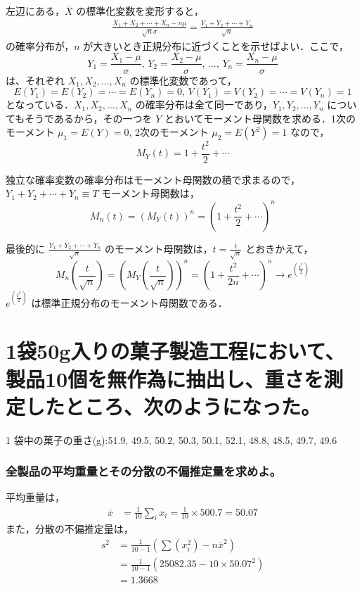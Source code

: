 \documentclass[titlepage,a4paper]{jsarticle}
\begin{document}
左辺にある，$\overline{X}$ の標準化変数を変形すると，
\begin{align}
  \frac{X_1 + X_2 + \cdots + X_n - n\mu}{\sqrt{n} \sigma} = \frac{Y_1 + Y_2 + \cdots + Y_n}{\sqrt{n}}
\end{align}
の確率分布が，$n$ が大きいとき正規分布に近づくことを示せばよい．ここで，
\[
  Y_1 = \frac{X_1 - \mu}{\sigma}, \, Y_2 = \frac{X_2 - \mu}{\sigma}, \, \ldots, \, Y_n = \frac{X_n - \mu}{\sigma}
\]
は、それぞれ $X_1, X_2, \ldots, X_n$ の標準化変数であって，
\[
  E(Y_1) = E(Y_2) = \cdots = E(Y_n) = 0, \, V(Y_1) = V(Y_2) = \cdots = V(Y_n) = 1
\]
となっている．$X_1, X_2, \ldots, X_n$ の確率分布は全て同一であり，$Y_1, Y_2, \ldots, Y_n$ についてもそうであるから，その一つを $Y$ とおいてモーメント母関数を求める．1次のモーメント $\mu_1 = E(Y) = 0$, 2次のモーメント $\mu_2 = E(Y^2) = 1$ なので，
\[
  M_Y(t) = 1 + \frac{t^2}{2} + \cdots
\]

独立な確率変数の確率分布はモーメント母関数の積で求まるので，$Y_1 + Y_2 + \cdots + Y_n \equiv T$ モーメント母関数は，
\[
  M_n(t) = \left( M_Y(t) \right)^n = \left( 1 + \frac{t^2}{2} + \cdots \right)^n
\]

最後的に $\frac{Y_1 + Y_2 + \cdots + Y_n}{\sqrt{n}}$ のモーメント母関数は，$t = \frac{t}{\sqrt{n}}$ とおきかえて，
\[
  M_n \left( \frac{t}{\sqrt{n}} \right) = \left( M_Y \left( \frac{t}{\sqrt{n}} \right) \right)^n
  = \left( 1 + \frac{t^2}{2n} + \cdots \right)^n \to e^{\left( \frac{t^2}{2} \right)}
\]
$e^{\left( \frac{t^2}{2} \right)}$ は標準正規分布のモーメント母関数である．
\section{1袋50g入りの菓子製造工程において、製品10個を無作為に抽出し、重さを測定したところ、次のようになった。}%
1 袋中の菓子の重さ(g):51.9, 49.5, 50.2, 50.3, 50.1, 52.1, 48.8, 48.5, 49.7, 49.6
\subsubsection{全製品の平均重量とその分散の不偏推定量を求めよ。}
平均重量は，
\begin{align}
  \overline{x} & = \frac{1}{10} \sum_i x_i = \frac{1}{10} \times 500.7 = 50.07
\end{align}
また，分散の不偏推定量は，
\begin{align}
  s^2 & = \frac{1}{10 - 1} \left( \sum (x_i^2) - n \overline{x}^2 \right) \\
      & = \frac{1}{10 - 1} \left( 25082.35 - 10 \times 50.07^2 \right)    \\
      & = 1.3668
\end{align}
\end{document}
